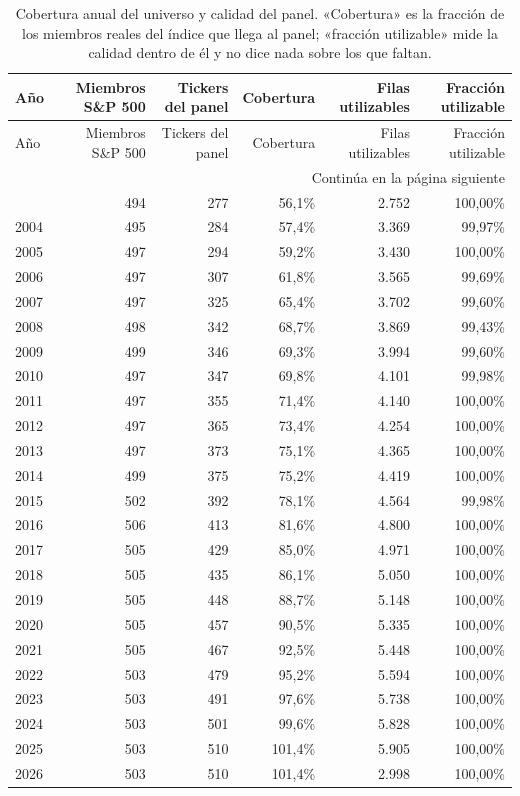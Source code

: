 \begin{longtable}{lrrrrr}
\caption{Cobertura anual del universo y calidad del panel. «Cobertura» es la fracción de los miembros reales del índice que llega al panel; «fracción utilizable» mide la calidad dentro de él y no dice nada sobre los que faltan.}\label{tab:cobertura-anual}\\
\toprule
Año & Miembros S\&P 500 & Tickers del panel & Cobertura & Filas utilizables & Fracción utilizable \\
\midrule
\endfirsthead
\toprule
Año & Miembros S\&P 500 & Tickers del panel & Cobertura & Filas utilizables & Fracción utilizable \\
\midrule
\endhead
\midrule
\multicolumn{6}{r}{\footnotesize Continúa en la página siguiente}\\
\endfoot
\bottomrule
\endlastfoot
2003 & 494 & 277 & 56,1\% & 2.752 & 100,00\% \\
2004 & 495 & 284 & 57,4\% & 3.369 & 99,97\% \\
2005 & 497 & 294 & 59,2\% & 3.430 & 100,00\% \\
2006 & 497 & 307 & 61,8\% & 3.565 & 99,69\% \\
2007 & 497 & 325 & 65,4\% & 3.702 & 99,60\% \\
2008 & 498 & 342 & 68,7\% & 3.869 & 99,43\% \\
2009 & 499 & 346 & 69,3\% & 3.994 & 99,60\% \\
2010 & 497 & 347 & 69,8\% & 4.101 & 99,98\% \\
2011 & 497 & 355 & 71,4\% & 4.140 & 100,00\% \\
2012 & 497 & 365 & 73,4\% & 4.254 & 100,00\% \\
2013 & 497 & 373 & 75,1\% & 4.365 & 100,00\% \\
2014 & 499 & 375 & 75,2\% & 4.419 & 100,00\% \\
2015 & 502 & 392 & 78,1\% & 4.564 & 99,98\% \\
2016 & 506 & 413 & 81,6\% & 4.800 & 100,00\% \\
2017 & 505 & 429 & 85,0\% & 4.971 & 100,00\% \\
2018 & 505 & 435 & 86,1\% & 5.050 & 100,00\% \\
2019 & 505 & 448 & 88,7\% & 5.148 & 100,00\% \\
2020 & 505 & 457 & 90,5\% & 5.335 & 100,00\% \\
2021 & 505 & 467 & 92,5\% & 5.448 & 100,00\% \\
2022 & 503 & 479 & 95,2\% & 5.594 & 100,00\% \\
2023 & 503 & 491 & 97,6\% & 5.738 & 100,00\% \\
2024 & 503 & 501 & 99,6\% & 5.828 & 100,00\% \\
2025 & 503 & 510 & 101,4\% & 5.905 & 100,00\% \\
2026 & 503 & 510 & 101,4\% & 2.998 & 100,00\% \\
\end{longtable}
